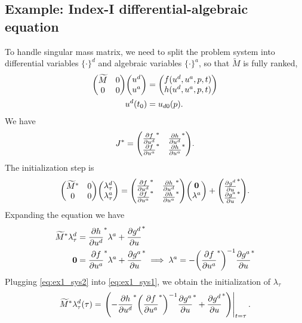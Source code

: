 \documentclass[a4paper,9pt]{article}
\theoremstyle{definition}
\theoremstyle{remark}
\begin{document}
\subsection{Example: Index-I differential-algebraic equation}
To handle singular mass matrix, we need to split the problem system into
differential variables $\{\cdot\}^d$ and algebraic
variables $\{\cdot\}^a$, so that $\widetilde{M}$ is fully ranked,
\begin{align}
  \mqty(\widetilde{M} & 0 \\ 0 & 0) \mqty(u^d\\ u^a) &= \mqty(f(u^d, u^a, p, t)
  \\ h(u^d, u^a, p, t)) \\
  u^d(t_0) &= u_{d0}(p).
\end{align}
We have
\begin{equation}
  J^* = \mqty(\pdv{f}{u^d}^* & \pdv{h}{u^d}^* \\ \pdv{f}{u^a}^* &
  \pdv{h}{u^a}^*).
\end{equation}
The initialization step is
\begin{equation}
  \mqty(\widetilde{M}^* & 0 \\ 0 & 0) \mqty(\lambda_\tau^d\\ \lambda_\tau^a) =
  \mqty(\pdv{f}{u^d}^* & \pdv{h}{u^d}^* \\ \pdv{f}{u^a}^* &
  \pdv{h}{u^a}^*) \mqty(\bm{0}\\ \lambda^a) + \mqty(\pdv{g^d}{u}^* \\
  \pdv{g^a}{u}^*).
\end{equation}
Expanding the equation we have
\begin{align}
  \widetilde{M}^* \lambda_\tau^d &= \pdv{h}{u^d}^* \lambda^a + \pdv{g^d}{u}^*
  \label{eq:ex1_sys1} \\
  \bm{0} &= \pdv{f}{u^a}^* \lambda^a + \pdv{g^a}{u}^* \implies
  \lambda^a = -\qty(\pdv{f}{u^a}^*)^{-1}\pdv{g^a}{u}^* \label{eq:ex1_sys2}
\end{align}
Plugging \cref{eq:ex1_sys2} into \cref{eq:ex1_sys1}, we obtain the
initialization of $\lambda_\tau$
\begin{equation}
  \widetilde{M}^* \lambda_\tau^d(\tau) = \eval{\qty(-\pdv{h}{u^d}^*
    \qty(\pdv{f}{u^a}^*)^{-1}\pdv{g^a}{u}^* +
  \pdv{g^d}{u}^*)}_{t=\tau}.
\end{equation}
\end{document}
